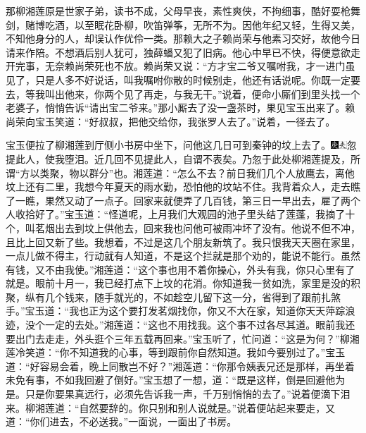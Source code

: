 那柳湘莲原是世家子弟，读书不成，父母早丧，素性爽侠，不拘细事，酷好耍枪舞剑，赌博吃酒，以至眠花卧柳，吹笛弹筝，无所不为。因他年纪又轻，生得又美，不知他身分的人，却误认作优伶一类。那赖大之子赖尚荣与他素习交好，故他今日请来作陪。不想酒后别人犹可，独薛蟠又犯了旧病。他心中早已不快，得便意欲走开完事，无奈赖尚荣死也不放。赖尚荣又说：``方才宝二爷又嘱咐我，才一进门虽见了，只是人多不好说话，叫我嘱咐你散的时候别走，他还有话说呢。你既一定要去，等我叫出他来，你两个见了再走，与我无干。''说着，便命小厮们到里头找一个老婆子，悄悄告诉``请出宝二爷来。''那小厮去了没一盏茶时，果见宝玉出来了。赖尚荣向宝玉笑道：``好叔叔，把他交给你，我张罗人去了。''说着，一径去了。

宝玉便拉了柳湘莲到厅侧小书房中坐下，问他这几日可到秦钟的坟上去了。{\includegraphics[width=3mm]{../Images/00004}\includegraphics[width=3mm]{../Images/00012}\footnotesize \kaishu 忽提此人，使我堕泪。近几回不见提此人，自谓不表矣。乃忽于此处柳湘莲提及，所谓``方以类聚，物以群分''也。}湘莲道：``怎么不去？前日我们几个人放鹰去，离他坟上还有二里，我想今年夏天的雨水勤，恐怕他的坟站不住。我背着众人，走去瞧了一瞧，果然又动了一点子。回家来就便弄了几百钱，第三日一早出去，雇了两个人收拾好了。''宝玉道：``怪道呢，上月我们大观园的池子里头结了莲蓬，我摘了十个，叫茗烟出去到坟上供他去，回来我也问他可被雨冲坏了没有。他说不但不冲，且比上回又新了些。我想着，不过是这几个朋友新筑了。我只恨我天天圈在家里，一点儿做不得主，行动就有人知道，不是这个拦就是那个劝的，能说不能行。虽然有钱，又不由我使。''湘莲道：``这个事也用不着你操心，外头有我，你只心里有了就是。眼前十月一，我已经打点下上坟的花消。你知道我一贫如洗，家里是没的积聚，纵有几个钱来，随手就光的，不如趁空儿留下这一分，省得到了跟前扎煞手。''宝玉道：``我也正为这个要打发茗烟找你，你又不大在家，知道你天天萍踪浪迹，没个一定的去处。''湘莲道：``这也不用找我。这个事不过各尽其道。眼前我还要出门去走走，外头逛个三年五载再回来。''宝玉听了，忙问道：``这是为何？''柳湘莲冷笑道：``你不知道我的心事，等到跟前你自然知道。我如今要别过了。''宝玉道：``好容易会着，晚上同散岂不好？''湘莲道：``你那令姨表兄还是那样，再坐着未免有事，不如我回避了倒好。''宝玉想了一想，道：``既是这样，倒是回避他为是。只是你要果真远行，必须先告诉我一声，千万别悄悄的去了。''说着便滴下泪来。柳湘莲道：``自然要辞的。你只别和别人说就是。''说着便站起来要走，又道：``你们进去，不必送我。''一面说，一面出了书房。

